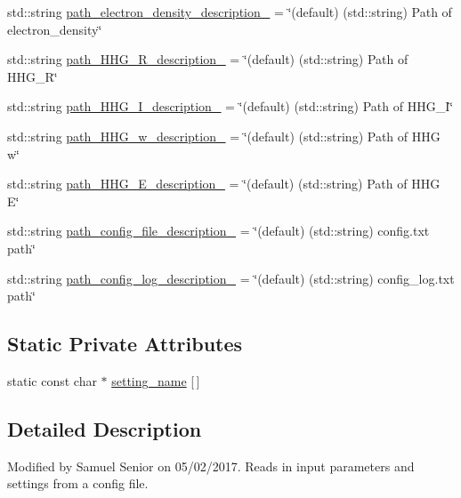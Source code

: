 \begin{DoxyCompactItemize}
std\+::string \hyperlink{class_config___settings_aab69520f2d9a32adb57e801d7e3aff41}{path\+\_\+electron\+\_\+density\+\_\+description\+\_\+} = \char`\"{}(default) (std\+::string) Path of electron\+\_\+density\char`\"{}
\item 
std\+::string \hyperlink{class_config___settings_a8a300cf9bc390120c5ef28b582642fee}{path\+\_\+\+H\+H\+G\+\_\+\+R\+\_\+description\+\_\+} = \char`\"{}(default) (std\+::string) Path of H\+H\+G\+\_\+R\char`\"{}
\item 
std\+::string \hyperlink{class_config___settings_a52fd55161336c0781a2402646080a324}{path\+\_\+\+H\+H\+G\+\_\+\+I\+\_\+description\+\_\+} = \char`\"{}(default) (std\+::string) Path of H\+H\+G\+\_\+I\char`\"{}
\item 
std\+::string \hyperlink{class_config___settings_a101fd823638d56f7106d4eb0b09390f6}{path\+\_\+\+H\+H\+G\+\_\+w\+\_\+description\+\_\+} = \char`\"{}(default) (std\+::string) Path of H\+HG w\char`\"{}
\item 
std\+::string \hyperlink{class_config___settings_ac686fefeabb6c673cec2c785acff86f5}{path\+\_\+\+H\+H\+G\+\_\+\+E\+\_\+description\+\_\+} = \char`\"{}(default) (std\+::string) Path of H\+HG E\char`\"{}
\item 
std\+::string \hyperlink{class_config___settings_a34af93c4eaa2f2767bb290a1497ad62f}{path\+\_\+config\+\_\+file\+\_\+description\+\_\+} = \char`\"{}(default) (std\+::string) config.\+txt path\char`\"{}
\item 
std\+::string \hyperlink{class_config___settings_aaae6998d89fe68cfb33abbdb30929cb1}{path\+\_\+config\+\_\+log\+\_\+description\+\_\+} = \char`\"{}(default) (std\+::string) config\+\_\+log.\+txt path\char`\"{}
\end{DoxyCompactItemize}
\subsection*{Static Private Attributes}
\begin{DoxyCompactItemize}
\item 
static const char $\ast$ \hyperlink{class_config___settings_a05f6108c286f7e7bbbbb1063a77b9a71}{setting\+\_\+name} \mbox{[}$\,$\mbox{]}
\end{DoxyCompactItemize}


\subsection{Detailed Description}
Modified by Samuel Senior on 05/02/2017. Reads in input parameters and settings from a config file. 

